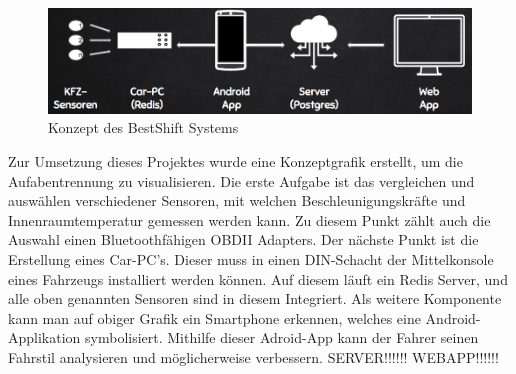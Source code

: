 
\begin{figure}[!htb]
	\centering
	\includegraphics[scale=0.5]{images/konzept}
	\caption{Konzept des BestShift Systems}
\end{figure}

Zur Umsetzung dieses Projektes wurde eine Konzeptgrafik erstellt, um die Aufabentrennung zu visualisieren.
\nextline
Die erste Aufgabe ist das vergleichen und auswählen verschiedener Sensoren, mit welchen Beschleunigungskräfte und Innenraumtemperatur gemessen werden kann. Zu diesem Punkt zählt auch die Auswahl einen Bluetoothfähigen OBDII Adapters.
\nextline
Der nächste Punkt ist die Erstellung eines Car-PC's. Dieser muss in einen DIN-Schacht der Mittelkonsole eines Fahrzeugs installiert werden können. Auf diesem läuft ein Redis Server, und alle oben genannten Sensoren sind in diesem Integriert.
\nextline
Als weitere Komponente kann man auf obiger Grafik ein Smartphone erkennen, welches eine Android-Applikation symbolisiert. Mithilfe dieser Adroid-App kann der Fahrer seinen Fahrstil analysieren und möglicherweise verbessern.
\nextline
SERVER!!!!!!
\nextline
WEBAPP!!!!!!